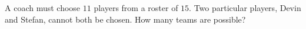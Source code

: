 A coach must choose $11$ players from a roster of $15$. Two particular players, Devin and Stefan, cannot both be chosen. How many teams are possible?
